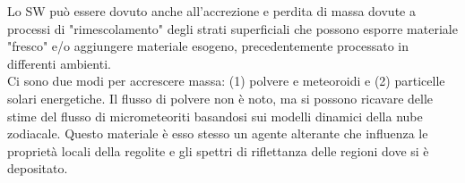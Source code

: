 \documentclass[a4paper,11pt,openright]{book}
\begin{document}


Lo SW può essere dovuto anche all'accrezione e perdita di massa dovute a processi di "rimescolamento" degli strati superficiali che possono esporre materiale "fresco" e/o aggiungere materiale esogeno, precedentemente processato in differenti ambienti.\\
Ci sono due modi per accrescere massa: (1) polvere e meteoroidi e (2) particelle solari energetiche. Il flusso di polvere non è noto, ma si possono ricavare delle stime del flusso di micrometeoriti basandosi sui modelli dinamici della nube zodiacale. Questo materiale è esso stesso un agente alterante che influenza le proprietà locali della regolite e gli spettri di riflettanza delle regioni dove si è depositato.\\
\end{document}
